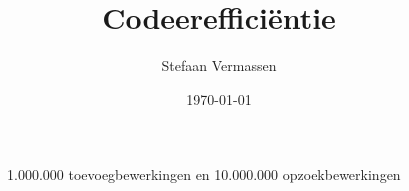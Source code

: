 \documentclass[12pt,a4paper,oneside]{article}
\begin{document}
\title{Codeereffici\"entie}
\author{Stefaan Vermassen}
\date{\today}
\pagestyle{fancy}
\fancyhf{}
\fancyfoot[C]{\thepage}
\maketitle
\tableofcontents
\newpage
\begin{figure}[H]
  \begin{center}
    
    \caption{1.000.000 toevoegbewerkingen en 10.000.000 opzoekbewerkingen}
    \label{graph:graph1}
  \end{center}
\end{figure}
\end{document}
